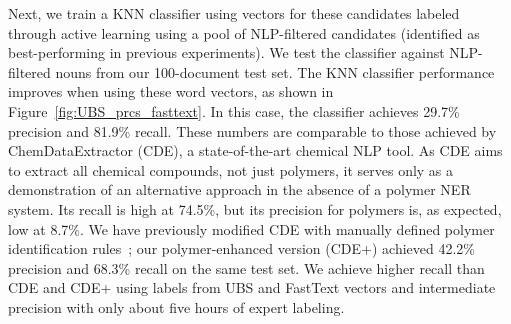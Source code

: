 Next, we train a KNN classifier using vectors for these candidates labeled through active learning using a pool of NLP-filtered candidates (identified as best-performing in previous experiments).
We test the classifier against NLP-filtered nouns from our 100-document test set.
The KNN classifier performance improves when using these word vectors, as shown in Figure~\ref{fig:UBS_prcs_fasttext}.
In this case, the classifier achieves 29.7\% precision and 81.9\% recall. 
These numbers are comparable to those achieved by ChemDataExtractor (CDE), a state-of-the-art chemical NLP tool.
As CDE aims to extract all
chemical compounds, not just polymers, it serves only as a demonstration of an
alternative approach in the absence of a polymer NER system. %
Its recall is high
at 74.5\%, but its precision for polymers is, as expected, low at 8.7\%. 
We have previously modified CDE with
manually defined polymer identification rules~\cite{tchoua2017towards};
our polymer-enhanced version (CDE+) achieved 42.2\% precision and 68.3\% recall on the same test set. 
We achieve higher recall than CDE and CDE+ using labels from UBS and FastText vectors and intermediate precision with only about five hours of expert labeling.


